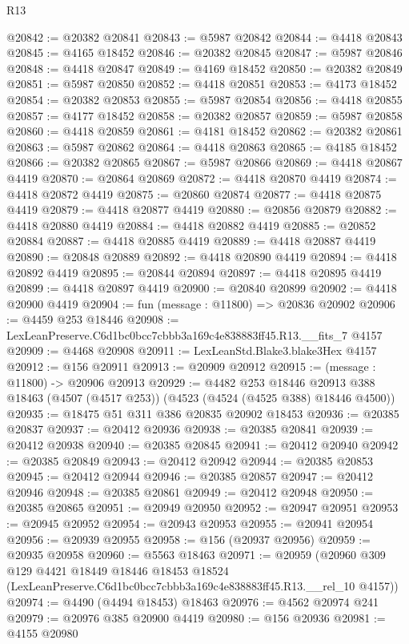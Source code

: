 \begin{lexlean}{R13}
\begin{coremodule}
@20842 := @20382 @20841
@20843 := @5987 @20842
@20844 := @4418 @20843
@20845 := @4165 @18452
@20846 := @20382 @20845
@20847 := @5987 @20846
@20848 := @4418 @20847
@20849 := @4169 @18452
@20850 := @20382 @20849
@20851 := @5987 @20850
@20852 := @4418 @20851
@20853 := @4173 @18452
@20854 := @20382 @20853
@20855 := @5987 @20854
@20856 := @4418 @20855
@20857 := @4177 @18452
@20858 := @20382 @20857
@20859 := @5987 @20858
@20860 := @4418 @20859
@20861 := @4181 @18452
@20862 := @20382 @20861
@20863 := @5987 @20862
@20864 := @4418 @20863
@20865 := @4185 @18452
@20866 := @20382 @20865
@20867 := @5987 @20866
@20869 := @4418 @20867 @4419
@20870 := @20864 @20869
@20872 := @4418 @20870 @4419
@20874 := @4418 @20872 @4419
@20875 := @20860 @20874
@20877 := @4418 @20875 @4419
@20879 := @4418 @20877 @4419
@20880 := @20856 @20879
@20882 := @4418 @20880 @4419
@20884 := @4418 @20882 @4419
@20885 := @20852 @20884
@20887 := @4418 @20885 @4419
@20889 := @4418 @20887 @4419
@20890 := @20848 @20889
@20892 := @4418 @20890 @4419
@20894 := @4418 @20892 @4419
@20895 := @20844 @20894
@20897 := @4418 @20895 @4419
@20899 := @4418 @20897 @4419
@20900 := @20840 @20899
@20902 := @4418 @20900 @4419
@20904 := fun (message : @11800) => @20836 @20902
@20906 := @4459 @253 @18446
@20908 := LexLeanPreserve.C6d1bc0bcc7cbbb3a169c4e838883ff45.R13.__fits_7 @4157
@20909 := @4468 @20908
@20911 := LexLeanStd.Blake3.blake3Hex @4157
@20912 := @156 @20911
@20913 := @20909 @20912
@20915 := (message : @11800) -> @20906 @20913
@20929 := @4482
    @253
    @18446
    @20913
    @388
    @18463
    (@4507 (@4517 @253))
    (@4523 (@4524 (@4525 @388) @18446 @4500))
@20935 := @18475 @51 @311 @386 @20835 @20902 @18453
@20936 := @20385 @20837
@20937 := @20412 @20936
@20938 := @20385 @20841
@20939 := @20412 @20938
@20940 := @20385 @20845
@20941 := @20412 @20940
@20942 := @20385 @20849
@20943 := @20412 @20942
@20944 := @20385 @20853
@20945 := @20412 @20944
@20946 := @20385 @20857
@20947 := @20412 @20946
@20948 := @20385 @20861
@20949 := @20412 @20948
@20950 := @20385 @20865
@20951 := @20949 @20950
@20952 := @20947 @20951
@20953 := @20945 @20952
@20954 := @20943 @20953
@20955 := @20941 @20954
@20956 := @20939 @20955
@20958 := @156 (@20937 @20956)
@20959 := @20935 @20958
@20960 := @5563 @18463
@20971 := @20959
    (@20960
      @309
      @129
      @4421
      @18449
      @18446
      @18453
      @18524
      (LexLeanPreserve.C6d1bc0bcc7cbbb3a169c4e838883ff45.R13.__rel_10 @4157))
@20974 := @4490 (@4494 @18453) @18463
@20976 := @4562 @20974 @241
@20979 := @20976 @385 @20900 @4419
@20980 := @156 @20936
@20981 := @4155 @20980

\end{coremodule}
\end{lexlean}
